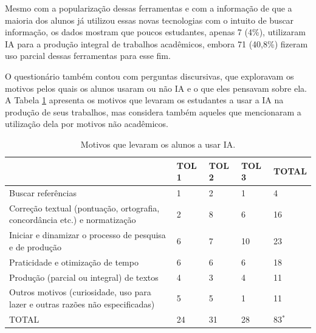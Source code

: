 \documentclass[portuguese]{textolivre}
\begin{document}
Mesmo com a popularização dessas ferramentas e com a informação de que a maioria dos alunos já utilizou essas novas tecnologias com o intuito de buscar informação, os dados mostram que poucos estudantes, apenas 7 (4\%), utilizaram IA para a produção integral de trabalhos acadêmicos, embora 71 (40,8\%) fizeram uso parcial dessas ferramentas para esse fim.

O questionário também contou com perguntas discursivas, que exploravam os motivos pelos quais os alunos usaram ou não IA e o que eles pensavam sobre ela. A Tabela \ref{tab-3} apresenta os motivos que levaram os estudantes a usar a IA na produção de seus trabalhos, mas considera também aqueles que mencionaram a utilização dela por motivos não acadêmicos.

\begin{table}[h!]
\centering
\begin{threeparttable}
\caption{Motivos que levaram os alunos a usar IA.}\label{tab-3}
\begin{tabularx}{\linewidth}{Xllll}
\toprule
 & TOL 1 & TOL 2 & TOL 3 & TOTAL \\
\midrule
Buscar referências & 1 & 2 & 1 & 4 \\
Correção textual (pontuação, ortografia, concordância etc.) e normatização & 2 & 8 & 6 & 16 \\
Iniciar e dinamizar o processo de pesquisa e de produção & 6 & 7 & 10 & 23 \\
Praticidade e otimização de tempo & 6 & 6 & 6 & 18 \\
Produção (parcial ou integral) de textos & 4 & 3 & 4 & 11 \\
Outros motivos (curiosidade, uso para lazer e outras razões não especificadas) & 5 & 5 & 1 & 11 \\
TOTAL & 24 & 31 & 28 & 83$^*$ \\
\bottomrule
\end{tabularx}
\end{threeparttable}
\end{table}
\end{document}

